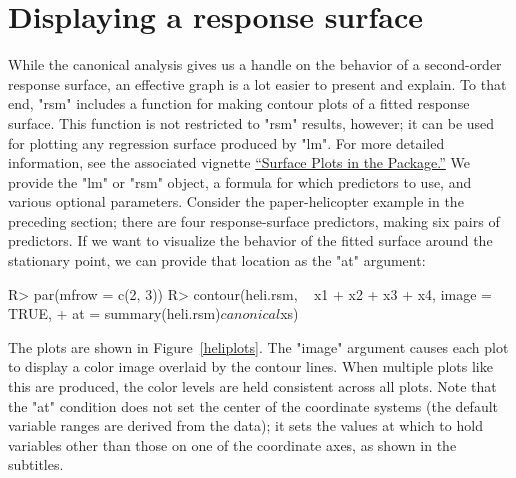 \documentclass[article,nojss]{jss}
\def\rsm{\pkg{rsm}}
\begin{document}
\section{Displaying a response surface}\label{contour}
While the canonical analysis gives us a handle on the behavior of a second-order response surface, an effective graph is a lot easier to present and explain.  To that end, "rsm" includes a function for making contour plots of a fitted response surface.  This function is not restricted to "rsm" results, however; it can be used for plotting any regression surface produced by "lm".  For more detailed information, see the associated vignette \href{rsm-plots.pdf}{``Surface Plots in the \rsm{} Package.''}
We provide the "lm" or "rsm" object, a formula for which predictors to use, and various optional parameters.  Consider the paper-helicopter example in the preceding section; there are four response-surface predictors, making six pairs of predictors.  If we want to visualize the behavior of the fitted surface around the stationary point, we can provide that location as the "at" argument:
\begin{Schunk}
\begin{Sinput}
R> par(mfrow = c(2, 3))
R> contour(heli.rsm, ~ x1 + x2 + x3 + x4, image = TRUE,
+   at = summary(heli.rsm)$canonical$xs)
\end{Sinput}
\end{Schunk}
The plots are shown in Figure~\ref{heliplots}.  The "image" argument causes each plot to display a color image overlaid by the
contour lines.  When multiple plots like this are produced, the color levels are held consistent across all
plots.  Note that the "at" condition does not set the center of the coordinate systems (the default variable
ranges are derived from the data); it sets the values at which to hold variables other than those on one of
the coordinate axes, as shown in the subtitles.
\end{document}
